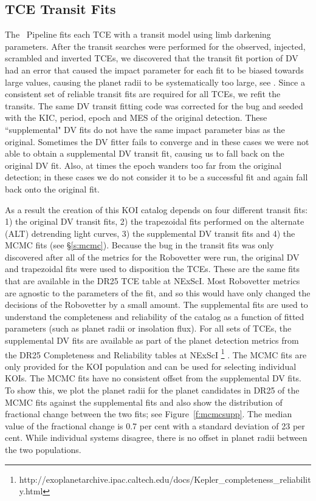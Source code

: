 \subsection{TCE Transit Fits}

The \Kepler\ Pipeline fits each TCE with a \citet{Mandel2002} transit model using \citet{Claret2000} limb darkening parameters. After the transit searches were performed for the observed, injected, scrambled and inverted TCEs, we discovered that the transit fit portion of DV had an error that caused the impact parameter for each fit to be biased towards large values, causing the planet radii to be systematically too large, see \citet{KSCI19110}. Since a consistent set of reliable transit fits are required for all TCEs, we refit the transits.  The same DV transit fitting code was corrected for the bug and seeded with the KIC, period, epoch and MES of the original detection. These ``supplemental" DV fits do not have the same impact parameter bias as the original.  Sometimes the DV fitter fails to converge and in these cases we were not able to obtain a supplemental DV transit fit, causing us to fall back on the original DV fit. Also, at times the epoch wanders too far from the original detection; in these cases we do not consider it to be a successful fit and again fall back onto the original fit.

As a result the creation of this KOI catalog depends on four different transit fits: 1) the original DV transit fits, 2) the trapezoidal fits performed on the alternate (ALT) detrending light curves, 3) the supplemental DV transit fits and 4) the MCMC fits (see \S\ref{s:mcmc}).  Because the bug in the transit fits was only discovered after all of the metrics for the Robovetter were run, the original DV and trapezoidal fits were used to disposition the TCEs. These are the same fits that are available in the DR25 TCE table at NExScI.  Most Robovetter metrics are agnostic to the parameters of the fit, and so this would have only changed the decisions of the Robovetter by a small amount.  The supplemental fits are used to understand the completeness and reliability of the catalog as a function of fitted parameters (such as planet radii or insolation flux).  For all sets of TCEs, the supplemental DV fits are available as part of the planet detection metrics from the DR25 Completeness and Reliability tables at NExScI \footnote{http://exoplanetarchive.ipac.caltech.edu/docs/Kepler\_completeness\_reliability.html}  \citep{KSCI19110,KSCI19114}. The MCMC fits are only provided for the KOI population and can be used for selecting individual KOIs. The MCMC fits have no consistent offset from the supplemental DV fits.  To show this, we plot the planet radii for the planet candidates in DR25 of the MCMC fits against the supplemental fits and also show the distribution of fractional change between the two fits; see Figure~\ref{f:mcmcsupp}. The median value of the fractional change is 0.7 per cent with a standard deviation of 23 per cent. While individual systems disagree, there is no offset in planet radii between the two populations.  

